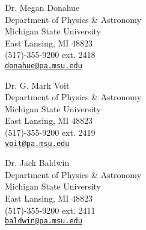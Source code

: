 \documentclass[12pt]{cv}
\begin{document}
\begin{llist}


{\sc Dr. Megan Donahue}\\
Department of Physics \& Astronomy\\
Michigan State University\\
East Lansing, MI 48823\\
(517)-355-9200 ext. 2418\\
\href{mailto:donahue@pa.msu.edu}{\tt donahue@pa.msu.edu}

{\sc Dr. G. Mark Voit}\\
Department of Physics \& Astronomy\\
Michigan State University\\
East Lansing, MI 48823\\
(517)-355-9200 ext. 2419\\
\href{mailto:voit@pa.msu.edu}{\tt voit@pa.msu.edu}

{\sc Dr. Jack Baldwin}\\
Department of Physics \& Astronomy\\
Michigan State University\\
East Lansing, MI 48823\\
(517)-355-9200 ext. 2411\\
\href{mailto:baldwin@pa.msu.edu}{\tt baldwin@pa.msu.edu}

\end{llist}
\end{document}
